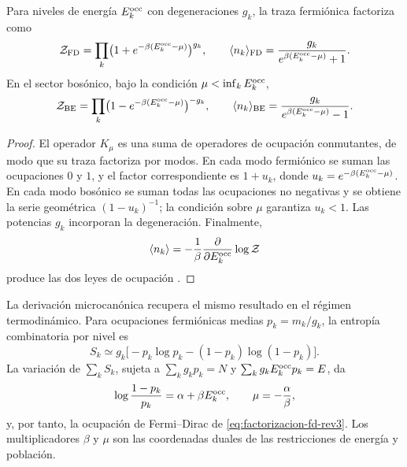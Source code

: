 \begin{theorem}
\label{thm:factorizacion-gran-canonica-rev3}
Para niveles de energía \(E_k^{\rm occ}\) con degeneraciones \(g_k\), la
traza fermiónica factoriza como
\begin{equation}
 \mathcal Z_{\rm FD}
 =\prod_k\bigl(1+e^{-\beta(E_k^{\rm occ}-\mu)}\bigr)^{g_k},
 \qquad
 \langle n_k\rangle_{\rm FD}
 =\frac{g_k}{e^{\beta(E_k^{\rm occ}-\mu)}+1}.
 \label{eq:factorizacion-fd-rev3}
\end{equation}
En el sector bosónico, bajo la condición
\(\mu<\inf_kE_k^{\rm occ}\),
\begin{equation}
 \mathcal Z_{\rm BE}
 =\prod_k\bigl(1-e^{-\beta(E_k^{\rm occ}-\mu)}\bigr)^{-g_k},
 \qquad
 \langle n_k\rangle_{\rm BE}
 =\frac{g_k}{e^{\beta(E_k^{\rm occ}-\mu)}-1}.
 \label{eq:factorizacion-be-rev3}
\end{equation}
\end{theorem}

\begin{proof}
El operador \(K_\mu\) es una suma de operadores de ocupación conmutantes, de
modo que su traza factoriza por modos. En cada modo fermiónico se suman las
ocupaciones \(0\) y \(1\), y el factor correspondiente es
\(1+u_k\), donde
\(u_k=e^{-\beta(E_k^{\rm occ}-\mu)}\). En cada modo bosónico se suman todas
las ocupaciones no negativas y se obtiene la serie geométrica
\((1-u_k)^{-1}\); la condición sobre \(\mu\) garantiza \(u_k<1\). Las
potencias \(g_k\) incorporan la degeneración. Finalmente,
\[
 \langle n_k\rangle
 =-\frac1\beta\frac{\partial}{\partial E_k^{\rm occ}}
   \log\mathcal Z
\]
produce las dos leyes de ocupación
\cite{Bose1924,Einstein1924,Fermi1926,Dirac1926,Pathria2011}.
\end{proof}

La derivación microcanónica recupera el mismo resultado en el régimen
termodinámico. Para ocupaciones fermiónicas medias
\(p_k=m_k/g_k\), la entropía combinatoria por nivel es
\begin{equation}
 S_k\simeq
 g_k\bigl[-p_k\log p_k-(1-p_k)\log(1-p_k)\bigr].
 \label{eq:entropia-fd-nivel-rev3}
\end{equation}
La variación de \(\sum_kS_k\), sujeta a
\(\sum_kg_kp_k=N\) y
\(\sum_kg_kE_k^{\rm occ}p_k=E\), da
\begin{equation}
 \log\frac{1-p_k}{p_k}=\alpha+\beta E_k^{\rm occ},
 \qquad
 \mu=-\frac{\alpha}{\beta},
 \label{eq:variacion-fd-rev3}
\end{equation}
y, por tanto, la ocupación de Fermi--Dirac de
\eqref{eq:factorizacion-fd-rev3}. Los multiplicadores \(\beta\) y \(\mu\)
son las coordenadas duales de las restricciones de energía y población.

